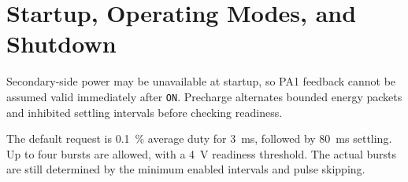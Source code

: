 \section{Startup, Operating Modes, and Shutdown}
\label{sec:ctrl-state}

Secondary-side power may be unavailable at startup, so PA1 feedback cannot be assumed valid immediately after \texttt{ON}. Precharge alternates bounded energy packets and inhibited settling intervals before checking readiness.

The default request is \SI{0.1}{\percent} average duty for \SI{3}{\milli\second}, followed by \SI{80}{\milli\second} settling. Up to four bursts are allowed, with a \SI{4}{\volt} readiness threshold. The actual bursts are still determined by the minimum enabled intervals and pulse skipping.

